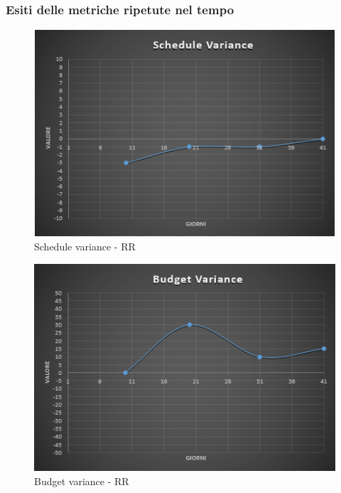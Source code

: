 \newpage

\subsubsection{Esiti delle metriche ripetute nel tempo}

\begin{figure}[H]
	\centering 
	\includegraphics[scale=0.6]{Sezioni/Immagini/ScheduleVariance-RR}
	\caption{Schedule variance - RR}
\end{figure}

\begin{figure}[H]
	\centering 
	\includegraphics[scale=0.6]{Sezioni/Immagini/BudgetVariance-RR}
	\caption{Budget variance - RR}
\end{figure}

